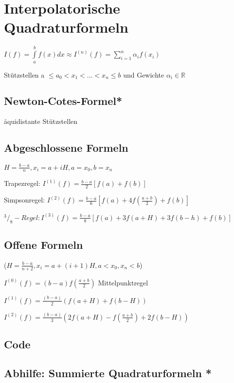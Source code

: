 \documentclass[12pt,a4paper]{article} %
\newcommand*\tab[1][1cm]{\hspace*{#1}}
\newcommand*\rfrac[2]{{}^{#1}\!/_{#2}} %
\begin{document}
	\section{Interpolatorische Quadraturformeln}
	
	$I(f) = \int\limits_{a}^{b}f(x)dx \approx I^{(n)}(f) = \sum\limits_{i = 1}^{n}\alpha_if(x_i)$
	
	Stützstellen a $\le a_0 < x_1 < ... < x_n \le b$ und Gewichte $\alpha_i \in \mathbb{R}$
	
	\subsection{Newton-Cotes-Formel*}
	
	äquidistante Stützstellen
	
	\subsection{Abgeschlossene Formeln}
	
	$H = \frac{b - a}{n}, x_i = a + iH, a = x_0, b = x_n$
	
	Trapezregel: $I^{(1)}(f) = \frac{b - a}{2}[f(a) + f(b)]$
	
	Simpsonregel: $I^{(2)}(f) = \frac{b - a}{6}[f(a) + 4f(\frac{a + b}{2}) + f(b)]$
	
	$\rfrac{3}{8}-Regel: I^{(3)}(f) = \frac{b - a}{8}[f(a) + 3f(a + H) + 3f(b - h) + f(b)]$
	
	\subsection{Offene Formeln}
	
	($H = \frac{b - a}{n + 2}, x_i = a + (i + 1)H, a < x_0, x_n < b$)
	
	$I^{(0)}(f) = (b - a)f(\frac{a + b}{2})$ \tab Mittelpunktregel
	
	$I^{(1)}(f) = \frac{(b - a)}{2}(f(a + H) + f(b - H))$
	
	$I^{(2)}(f) = \frac{(b-  a)}{3}(2f(a + H) - f(\frac{a + b}{2}) + 2f(b - H))$
	
	\subsection{Code}
	
	\subsection{Abhilfe: Summierte Quadraturformeln *}
	
\end{document}
